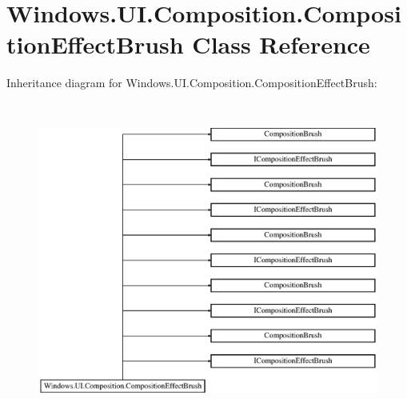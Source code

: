 \hypertarget{class_windows_1_1_u_i_1_1_composition_1_1_composition_effect_brush}{}\section{Windows.\+U\+I.\+Composition.\+Composition\+Effect\+Brush Class Reference}
\label{class_windows_1_1_u_i_1_1_composition_1_1_composition_effect_brush}
Inheritance diagram for Windows.\+U\+I.\+Composition.\+Composition\+Effect\+Brush\+:\begin{figure}[H]
\begin{center}
\leavevmode
\includegraphics[height=10.440678cm]{class_windows_1_1_u_i_1_1_composition_1_1_composition_effect_brush}
\end{center}
\end{figure}
